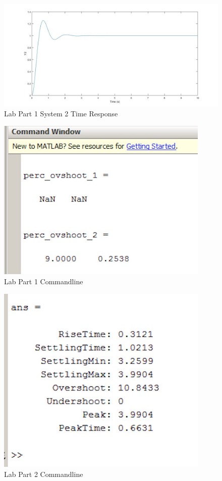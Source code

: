 \documentclass[12pt]{article}
\begin{document}
\begin{figure}[h!] %
   \centering
   \includegraphics[width=\linewidth]{time_response_system_2.jpg} 
   \caption{Lab Part 1 System 2 Time Response}
   \label{fig:example}
\end{figure}
\bigskip

\newpage

\begin{figure}[h!] %
   \centering
   \includegraphics[width=4in]{part_1_commandline.jpg} 
   \caption{Lab Part 1 Commandline}
   \label{fig:example}
\end{figure}
\bigskip
\bigskip

\begin{figure}[h!] %
   \centering
   \includegraphics[width=4in]{part_2_commandline.jpg} 
   \caption{Lab Part 2 Commandline}
   \label{fig:example}
\end{figure}
\end{document}
